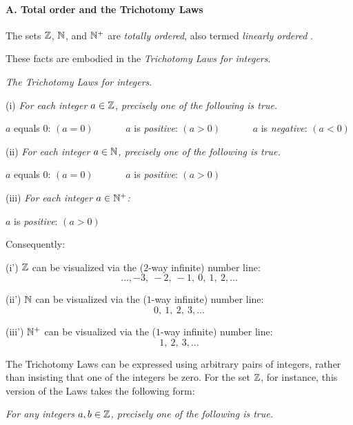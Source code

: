 \paragraph{\small\sf A. Total order and the Trichotomy Laws}

The sets $\mathbb{Z}$, $\mathbb{N}$, and $\mathbb{N}^+$ are {\em totally ordered},
also termed {\em linearly ordered}
.
\smallskip

These facts are embodied in the {\em Trichotomy Laws for integers}.
\medskip

{\it The Trichotomy Laws for integers}.
\smallskip

(i)
%
{\it For each integer $a \in \mathbb{Z}$, precisely one of the following is true.}

\hspace*{.2in} $a$ equals $0$: $(a=0)$ \ \ \ \ \ \
 $a$ is {\em positive}: $(a>0)$ \ \ \ \ \ \
 $a$ is {\em negative}: $(a<0)$
\smallskip

(ii)
%
{\it For each integer $a \in \mathbb{N}$, precisely one of the following is true.}

\hspace*{.2in} $a$ equals $0$: $(a=0)$ \ \ \ \ \ \
 $a$ is {\em positive}: $(a>0)$
\smallskip

(iii)
%
{\it For each integer $a \in \mathbb{N}^+$:}

\hspace*{.2in} $a$ is {\em positive}: $(a>0)$
\bigskip

Consequently:
\smallskip

(i')
$\mathbb{Z}$ can be visualized via the ($2$-way infinite) number line:
\[ \ldots, -3, \  -2, \ -1, \ 0, \ 1,\  2, \ldots \]
\smallskip

(ii')
$\mathbb{N}$ can be visualized via the ($1$-way infinite) number line:
\[  0, \ 1, \ 2, \ 3, \ldots \]
\smallskip

(iii')
$\mathbb{N}^+$ can be visualized via the ($1$-way infinite) number line:
\[  1, \ 2, \ 3, \ldots \]
\bigskip

The Trichotomy Laws can be expressed using arbitrary pairs of integers,
rather than insisting that one of the integers be zero.  For the set
$\mathbb{Z}$, for instance, this version of the Laws takes the following form:

{\it For any integers $a, b \in \mathbb{Z}$, precisely one of the following is
  true.}

